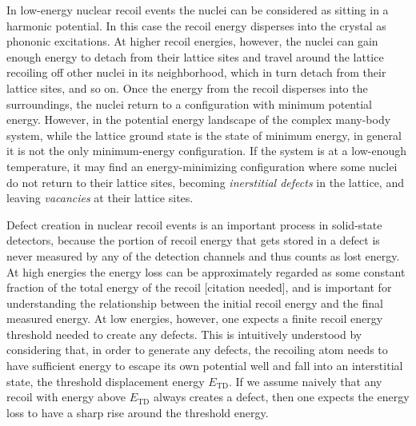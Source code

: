 \documentclass[b5paper, 10pt, twoside]{book}
\newcommand{\typographersred}{scp-red-dark-3}
\newcommand{\needcite}{\textcolor{\typographersred}{[citation needed]}}
\begin{document}
In low-energy nuclear recoil events the nuclei can be considered as sitting in a harmonic potential. In this case the recoil energy disperses into the crystal as phononic excitations. At higher recoil energies, however, the nuclei can gain enough energy to detach from their lattice sites and travel around the lattice recoiling off other nuclei in its neighborhood, which in turn detach from their lattice sites, and so on. Once the energy from the recoil disperses into the surroundings, the nuclei return to a configuration with minimum potential energy. However, in the potential energy landscape of the complex many-body system, while the lattice ground state is the state of minimum energy, in general it is not the only minimum-energy configuration. If the system is at a low-enough temperature, it may find an energy-minimizing configuration where some nuclei do not return to their lattice sites, becoming \emph{inerstitial defects} in the lattice, and leaving \emph{vacancies} at their lattice sites.

Defect creation in nuclear recoil events is an important process in solid-state detectors, because the portion of recoil energy that gets stored in a defect is never measured by any of the detection channels and thus counts as lost energy. At high energies the energy loss can be approximately regarded as some constant fraction of the total energy of the recoil \needcite, and is important for understanding the relationship between the initial recoil energy and the final measured energy. At low energies, however, one expects a finite recoil energy threshold needed to create any defects. This is intuitively understood  by considering that, in order to generate any defects, the recoiling atom needs to have sufficient energy to escape its own potential well and fall into an interstitial state, the threshold displacement energy  $E_\text{TD}$. If we assume naively that any recoil with energy above $E_\text{TD}$ always creates a defect, then one expects the energy loss to have a sharp rise around the threshold energy.
\end{document}
